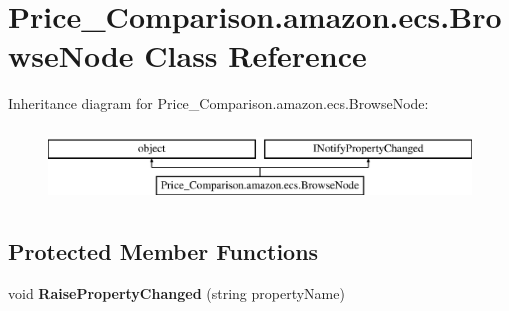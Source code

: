 \hypertarget{class_price___comparison_1_1amazon_1_1ecs_1_1_browse_node}{\section{Price\-\_\-\-Comparison.\-amazon.\-ecs.\-Browse\-Node Class Reference}
\label{class_price___comparison_1_1amazon_1_1ecs_1_1_browse_node}
}


 


Inheritance diagram for Price\-\_\-\-Comparison.\-amazon.\-ecs.\-Browse\-Node\-:\begin{figure}[H]
\begin{center}
\leavevmode
\includegraphics[height=2.000000cm]{class_price___comparison_1_1amazon_1_1ecs_1_1_browse_node}
\end{center}
\end{figure}
\subsection*{Protected Member Functions}
\begin{DoxyCompactItemize}
\item 
\hypertarget{class_price___comparison_1_1amazon_1_1ecs_1_1_browse_node_a6506bac9e2d11cab1a991f0f98568720}{void {\bfseries Raise\-Property\-Changed} (string property\-Name)}\label{class_price___comparison_1_1amazon_1_1ecs_1_1_browse_node_a6506bac9e2d11cab1a991f0f98568720}

\end{DoxyCompactItemize}
